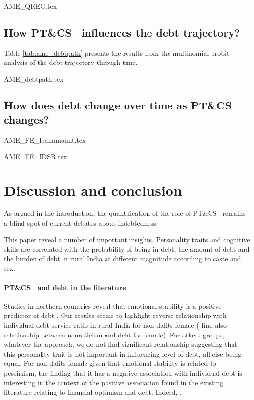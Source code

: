 \documentclass[a4paper, 11pt, onecolumn]{article}
\newcommand{\aebe}{all else being equal}
\newcommand{\PTCS}{PT\&CS}
\begin{document}
{AME_QREG.tex}



\subsection{How \PTCS~ influences the debt trajectory?}
 Table \ref{tab:ame_debtpath} presents the results from the multinomial probit analysis of the debt trajectory through time.
 
{AME_debtpath.tex}



\subsection{How does debt change over time as \PTCS~ changes?}

{AME_FE_loanamount.tex}

{AME_FE_IDSR.tex}





\clearpage
\newpage
\section{Discussion and conclusion}

As argued in the introduction, the quantification of the role of \PTCS~ remains a blind spot of current debates about indebtedness.


This paper reveal a number of important insights.
Personality traits and cognitive skills are correlated with the probability of being in debt, the amount of debt and the burden of debt in rural India at different magnitude according to caste and sex.


\paragraph{\PTCS~ and debt in the literature}
Studies in northern countries reveal that emotional stability is a positive predictor of debt \citep{Nyhus2001}.
Our results seems to highlight reverse relationship with individual debt service ratio in rural India for non-dalits female (\citealp{Brown2014} find also relationship between neuroticism and debt for female).
For others groups, whatever the approach, we do not find significant relationship suggesting that this personality trait is not important in influencing level of debt, \aebe.
For non-dalits female given that emotional stability is related to pessimism, the finding that it has a negative association with individual debt is interesting in the context of the positive association found in the existing literature relating to financial optimism and debt.
Indeed, .
\end{document}
